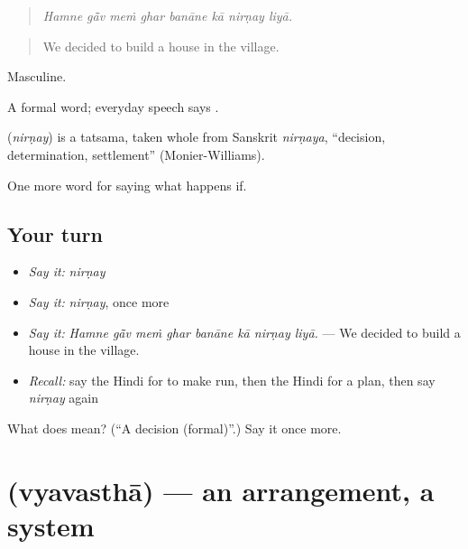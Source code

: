 \begin{quote}
       
\end{quote}

\begin{quote}
\emph{Hamne gā̃v meṁ ghar banāne kā nirṇay liyā.}
\end{quote}

\begin{quote}
We decided to build a house in the village.
\end{quote}

Masculine.

A formal word; everyday speech says .

\begin{cousinweb}
\textbf{} (\emph{nirṇay}) is a tatsama, taken whole from Sanskrit \emph{nirṇaya}, \textquotedblleft{}decision, determination, settlement\textquotedblright{} (Monier-Williams).
\end{cousinweb}

\begin{grammarlens}[title={What you've built}]
One more word for saying what happens if.
\end{grammarlens}

\subsection*{Your turn}
\begin{itemize}
\raggedright
  \item \emph{Say it:} \emph{nirṇay}
  \item \emph{Say it:} \emph{nirṇay}, once more
  \item \emph{Say it:} \emph{Hamne gā̃v meṁ ghar banāne kā nirṇay liyā.} — We decided to build a house in the village.
  \item \emph{Recall:} say the Hindi for to make run, then the Hindi for a plan, then say \emph{nirṇay} again
\end{itemize}

\begin{tcolorbox}[breakable,colback=teal!4,colframe=teal!35!black,title={Before you move on}]
What does  mean? (\textquotedblleft{}A decision (formal)\textquotedblright{}.) Say it once more.
\end{tcolorbox}
\section[\texorpdfstring{\hi{व्यवस्था} (vyavasthā)}{व्यवस्था (vyavasthā)}]{ (vyavasthā) — an arrangement, a system}

